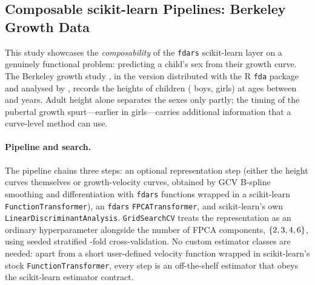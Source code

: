

\subsection{Composable scikit-learn Pipelines: Berkeley Growth Data}
\label{subsec:cs4-growth}

This study showcases the \emph{composability} of the \texttt{fdars}
scikit-learn layer on a genuinely functional problem: predicting a child's sex
from their growth curve.  The Berkeley growth study
\citep{tuddenham_snyder_1954}, in the version distributed with the R
\texttt{fda} package \citep{r_fda} and analysed by
\citet{ramsay_silverman_2005}, records the heights of
\csFourNChildren{} children (\csFourNBoys{} boys, \csFourNGirls{} girls) at
\csFourNAges{} ages between \csFourAgeMin{} and \csFourAgeMax{} years.  Adult height alone separates the
sexes only partly; the timing of the pubertal growth spurt---earlier in
girls---carries additional information that a curve-level method can use.

\paragraph{Pipeline and search.}
The pipeline chains three steps: an optional representation step (either the
height curves themselves or growth-velocity curves, obtained by GCV B-spline
smoothing and differentiation with \texttt{fdars} functions wrapped in a
scikit-learn \texttt{FunctionTransformer}), an \texttt{fdars}
\texttt{FPCATransformer}, and scikit-learn's own
\texttt{LinearDiscriminantAnalysis}.  \texttt{GridSearchCV} treats the
representation as an ordinary hyperparameter alongside the number of FPCA
components, $\{2, 3, 4, 6\}$, using seeded stratified \csFourNInner-fold
cross-validation.  No custom estimator classes are needed: apart from a
short user-defined velocity function wrapped in scikit-learn's stock
\texttt{FunctionTransformer}, every step is an off-the-shelf estimator that
obeys the scikit-learn estimator contract.

